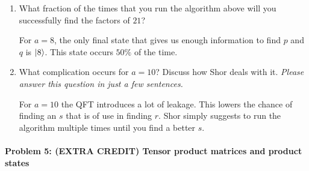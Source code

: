 \documentclass[12pt]{article}
\newenvironment{answer}{\begingroup\setlength{\leftskip}{-\leftmargin}\begin{framed}}{\end{framed}\endgroup}
\begin{document}
\begin{enumerate}
    \item  What fraction of the times that you run the algorithm above will you successfully find the factors of $21$?

    \begin{answer}
        For $a = 8$, the only final state that gives us enough information to find $p$ and $q$ is $\ket{8}$. This state occurs $50\%$ of the time.
    \end{answer}

    \item What complication occurs for $a = 10$? Discuss how Shor deals with it. \emph{Please answer this question in just a few sentences.}

    \begin{answer}
        For $a = 10$ the QFT introduces a lot of leakage. This lowers the chance of finding an $s$ that is of use in finding $r$. Shor simply suggests to run the algorithm multiple times until you find a better $s$.
    \end{answer}
\end{enumerate}

\paragraph{Problem 5: (EXTRA CREDIT) Tensor product matrices and product states} \hfill
\end{document}
